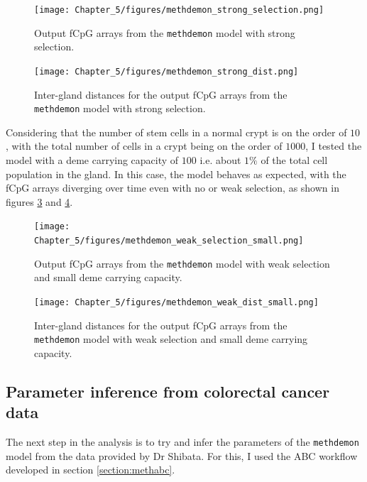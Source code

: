 \begin{figure}[h]
    \centering
    \texttt{[image: Chapter\_5/figures/methdemon\_strong\_selection.png]}
    \caption{Output fCpG arrays from the \texttt{methdemon} model with strong
    selection.}
    \label{fig:methdemon_strong_selection}
\end{figure}

\begin{figure}[h]
    \centering
    \texttt{[image: Chapter\_5/figures/methdemon\_strong\_dist.png]}
    \caption{Inter-gland distances for the output fCpG arrays from the
    \texttt{methdemon} model with strong selection.}
    \label{fig:methdemon_strong_dist}
\end{figure}

Considering that the number of stem cells in a normal crypt is on the order of
$10$ \cite{gehart_tales_2019, gabbutt_fluctuating_2022}, with the total number
of cells in a crypt being on the order of $1000$, I tested the model with a
deme carrying capacity of $100$ i.e. about $1\%$ of the total cell population
in the gland. In this case, the model behaves as expected, with the fCpG arrays
diverging over time even with no or weak selection, as shown in figures
\ref{fig:methdemon_weak_selection_small} and
\ref{fig:methdemon_weak_dist_small}.

\begin{figure}[h]
    \centering
    \texttt{[image: Chapter\_5/figures/methdemon\_weak\_selection\_small.png]}
    \caption{Output fCpG arrays from the \texttt{methdemon} model with weak
    selection and small deme carrying capacity.}
    \label{fig:methdemon_weak_selection_small}
\end{figure}

\begin{figure}[h]
    \centering
    \texttt{[image: Chapter\_5/figures/methdemon\_weak\_dist\_small.png]}
    \caption{Inter-gland distances for the output fCpG arrays from the
    \texttt{methdemon} model with weak selection and small deme carrying
    capacity.}
    \label{fig:methdemon_weak_dist_small}
\end{figure}

\subsection{Parameter inference from colorectal cancer data}
The next step in the analysis is to try and infer the parameters of the
\texttt{methdemon} model from the data provided by Dr Shibata. For this, I used
the ABC workflow developed in section \ref{section:methabc}.

